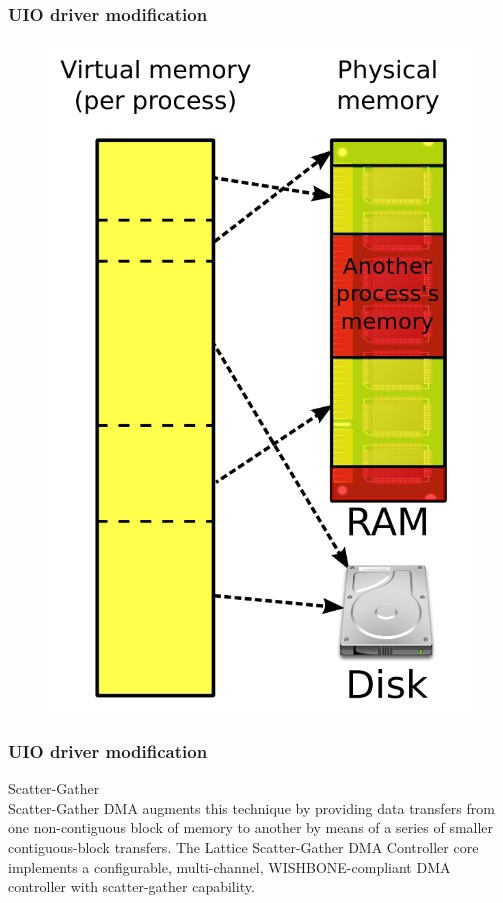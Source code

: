 \documentclass{beamer}
\begin{document}
\begin{frame}[fragile]
\frametitle{UIO driver modification}
\begin{figure}
\centering\includegraphics[scale=0.2]{virtual-memory.png}
\end{figure}
\end{frame}


\begin{frame}
\frametitle{UIO driver modification}
\centering Scatter-Gather\\

\centering Scatter-Gather DMA augments this technique by providing data transfers from one non-contiguous block of memory to another by means of a series of smaller contiguous-block transfers. The Lattice Scatter-Gather DMA Controller core implements a configurable, multi-channel, WISHBONE-compliant DMA controller with scatter-gather capability.

\end{frame}
\end{document}

